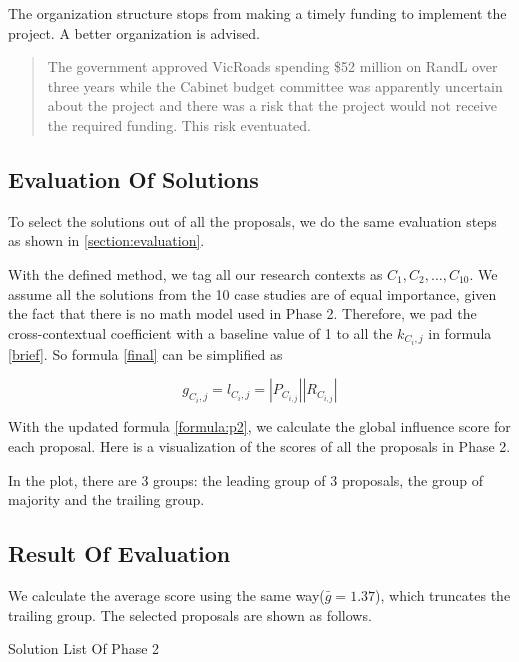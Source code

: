 The organization structure stops from making a timely funding to implement the project. A better organization is advised.
\begin{quotation}
The government approved VicRoads spending \$52 million on RandL over three years while the Cabinet budget committee was apparently uncertain about the project and there was a risk that the project would not receive the required funding. This risk eventuated.
\end{quotation}
\subsection{Evaluation Of Solutions}
To select the solutions out of all the proposals, we do the same evaluation steps as shown in \ref{section:evaluation}.

With the defined method, we tag all our research contexts as $C_{1}, C_{2}, \ldots, C_{10}$. We assume all the solutions from the 10 case studies are of equal importance, given the fact that there is no math model used in Phase 2. Therefore, we pad the cross-contextual coefficient with a baseline value of 1 to all the $\mathit{k_{C_{i},j}}$ in formula \ref{brief}. So formula \ref{final} can be simplified as 

\begin{equation}
g_{C_{i},j} = l_{C_{i},j} = |P_{C_{i,j}}| |R_{C_{i,j}}|
\label{formula:p2}
\end{equation}

With the updated formula \ref{formula:p2}, we calculate the global influence score for each proposal. Here is a visualization of the scores of all the proposals in Phase 2.

In the plot, there are 3 groups: the leading group of 3 proposals, the group of majority and the trailing group.

\begin{figure}[ht]
\centering
{}
\end{figure}
\subsection{Result Of Evaluation}
We calculate the average score using the same way($\bar{g}=1.37$), which truncates the trailing group. The selected proposals are shown as follows.

\begin{table}[ht]
\caption{Solution List Of Phase 2}
\label{tab:solution2}
\end{table}